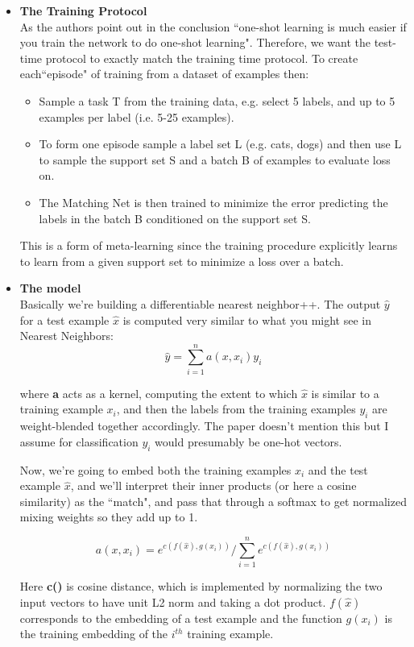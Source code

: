 \begin{itemize}
\item \textbf{The Training Protocol}\\
As the authors point out in the conclusion ``one-shot learning is much easier if you train the network to do one-shot learning". Therefore, we want the test-time protocol to exactly match the training time protocol.
To create each``episode" of training from a dataset of examples then:
\begin{itemize}
\item  Sample a task T from the training data, e.g. select 5 labels, and up to 5 examples per label (i.e. 5-25 examples).
\item To form one episode sample a label set L (e.g. {cats, dogs}) and then use L to sample the support set S and a batch B of examples to evaluate loss on.
\item  The Matching Net is then trained to minimize the error predicting the labels in the batch B conditioned on the support set S. 
\end{itemize}
This is a form of meta-learning since the training procedure explicitly learns to learn from a given support set to minimize a loss over a batch.

\item \textbf{The model}\\
Basically we're building a differentiable nearest neighbor++. The output $\hat{y}$ for a test example $\hat{x}$ is computed very similar to what you might see in Nearest Neighbors: 
$$\hat{y} = \sum_{i=1}^{n} a(x, x_i)y_i$$

where \textbf{a} acts as a kernel, computing the extent to which $\hat{x}$ is similar to a training example $x_i$, and then the labels from the training examples $y_i$ are weight-blended together accordingly. The paper doesn't mention this but I assume for classification $y_i$ would presumably be one-hot vectors.

Now, we're going to embed both the training examples $x_i$ and the test example $\hat{x}$, and we'll interpret their inner products (or here a cosine similarity) as the ``match", and pass that through a softmax to get normalized mixing weights so they add up to 1.

$$ a(x,x_i) = e^{c(f(\hat{x}), g(x_i))}/ \sum_{i=1}^{n} e^{c(f(\hat{x}), g(x_i))} $$

Here \textbf{c()} is cosine distance, which is implemented by normalizing the two input vectors to have unit L2 norm and taking a dot product. \textbf{$f(\hat{x})$} corresponds to the embedding of a test example and the function \textbf{$g(x_i)$} is the training embedding of the $i^{th}$ training example.\newline


\end{itemize}

